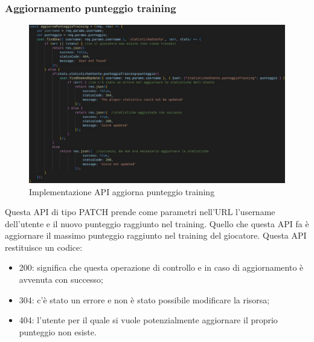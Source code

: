 \subsubsection{Aggiornamento punteggio training}
\begin{figure}[!h]
\centering
\includegraphics[scale=0.4]{images/api_aggiorna_punteggio_training.jpg}
\caption{Implementazione API aggiorna punteggio training}
\label{fig:api_aggiorna_punteggio_training}
\end{figure}
\noindent
Questa API di tipo PATCH prende come parametri nell'URL l'username dell'utente e il nuovo punteggio raggiunto nel training. Quello che questa API fa è aggiornare il massimo punteggio raggiunto nel training del giocatore.
Questa API restituisce un codice:
\begin{itemize}
    \item 200: significa che questa operazione di controllo e in caso di aggiornamento è avvenuta con successo;
    \item 304: c'è stato un errore e non è stato possibile modificare la risorsa;
    \item 404: l'utente per il quale si vuole potenzialmente aggiornare il proprio punteggio non esiste.
\end{itemize}

\newpage
